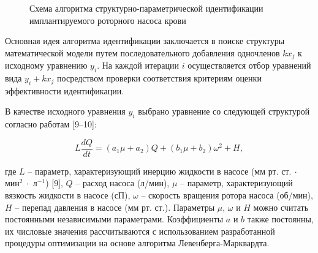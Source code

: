 \begin{figure}[!ht]
\caption{Схема алгоритма структурно-параметрической идентификации имплантируемого роторного насоса крови} 
\label{img:flowchart}  
\end{figure}

Основная идея алгоритма идентификации заключается в поиске структуры математической модели путем последовательного добавления одночленов $kx_j$ к исходному уравнению $y_i$. На каждой итерации $i$ осуществляется отбор уравнений вида $y_i + kx_j$ посредством проверки соответствия критериям оценки эффективности идентификации. %

В качестве исходного уравнения $y_i$ выбрано уравнение со следующей структурой согласно работам [9--10]: 


\begin{equation}
	\label{eq:initial_eq}
	L\frac{dQ}{dt} = (a_1\mu+a_2)Q + (b_1\mu+b_2)\omega^2 + H,
\end{equation}


\noindent где $L$ -- параметр, характеризующий инерцию жидкости в насосе (мм рт. ст.$~\cdot$ мин$^2~\cdot$ л$^{-1}$) [9], $Q$ -- расход насоса (л/мин), $\mu$ -- параметр, характеризующий вязкость жидкости в насосе (сП), $\omega$ -- скорость вращения ротора насоса (об/мин), $H$ -- перепад давления в насосе (мм рт. ст.). Параметры $\mu$, $\omega$ и $H$ можно считать постоянными независимыми параметрами. Коэффициенты $a$ и $b$ также постоянны, их числовые значения рассчитываются с использованием разработанной процедуры оптимизации на основе алгоритма Левенберга-Марквардта. 

